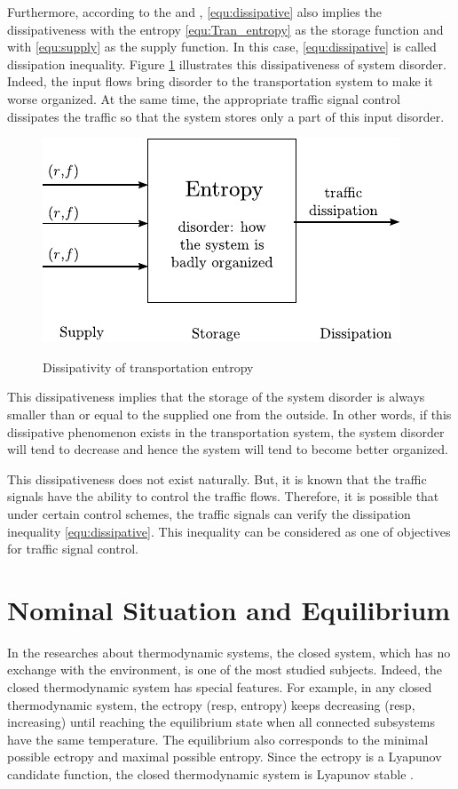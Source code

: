 \documentclass[preprint,authoryear,12pt]{elsarticle}
\begin{document}
Furthermore, according to the \citet{willems_dissipative_1972} and \citet{hill_dissipative_1980}, \eqref{equ:dissipative} also implies the dissipativeness with the entropy \eqref{equ:Tran_entropy} as the storage function and with \eqref{equ:supply} as the supply function. In this case, \eqref{equ:dissipative} is called dissipation inequality. Figure \ref{fig:trans_dis} illustrates this dissipativeness of system disorder. Indeed, the input flows bring disorder to the transportation system to make it worse organized. At the same time, the appropriate traffic signal control dissipates the traffic so that the system stores only a part of this input disorder.
\begin{figure}[ht]
  \centering
  \includegraphics{pics/trans_dis}\\
  \caption{Dissipativity of transportation entropy}
  \label{fig:trans_dis}
\end{figure}

This dissipativeness implies that the storage of the system disorder is always smaller than or equal to the supplied one from the outside. In other words, if this dissipative phenomenon exists in the transportation system, the system disorder will tend to decrease and hence the system will tend to become better organized.

This dissipativeness does not exist naturally. But, it is known that the traffic signals have the ability to control the traffic flows. Therefore, it is possible that under certain control schemes, the traffic signals can verify the dissipation inequality \eqref{equ:dissipative}. This inequality can be considered as one of objectives for traffic signal control.

\section{Nominal Situation and Equilibrium}

In the researches about thermodynamic systems, the closed system,
which has no exchange with the environment, is one of the most
studied subjects. Indeed, the closed thermodynamic system has special
features. For example, in any closed thermodynamic system, the
ectropy (resp, entropy) keeps decreasing (resp, increasing) until
reaching the equilibrium state when all connected subsystems have the
same temperature. The equilibrium also corresponds to the minimal
possible ectropy and maximal possible entropy. Since the ectropy is a
Lyapunov candidate function, the closed thermodynamic system is
Lyapunov stable \citep{haddad_thermodynamic_2005}.
\end{document}
